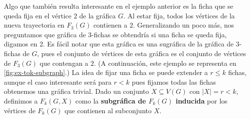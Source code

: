 Algo que tambi\'en resulta interesante en el ejemplo anterior es la ficha que se
queda fija en el v\'ertice $2$ de la gr\'afica $G$. Al estar fija, todos los
v\'ertices de la nueva trayectoria en $F_3(G)$ contienen a $2$. Generalizando un
poco m\'as, nos preguntamos que gr\'afica de $3$-fichas se obtendr\'ia si una
ficha se queda fija, digamos en $2$. Es f\'acil notar que esta gr\'afica es una
sugr\'afica de la gr\'afica de $3$-fichas de $G$, pues el conjunto de v\'ertices
de esta gr\'afica es el conjunto de v\'ertices de $F_3(G)$ que contengan a $2$.
(A continuaci\'on, este ejemplo se representa en \cref{fig:ex-tok-subgraph}.)
La idea de fijar una ficha se puede extender a $r\leq k$ fichas, aunque el caso
interesante ser\'a para $r<k$ pues fijamos todas las fichas obtenemos una
gr\'afica trivial. Dado un conjunto $X \subseteq V(G)$ con $|X|=r<k$, definimos
a $F_k(G,X)$ como la \textbf{subgr\'afica de $F_k(G)$
inducida} por los v\'ertices de $F_k(G)$ que contienen al subconjunto $X$. 

